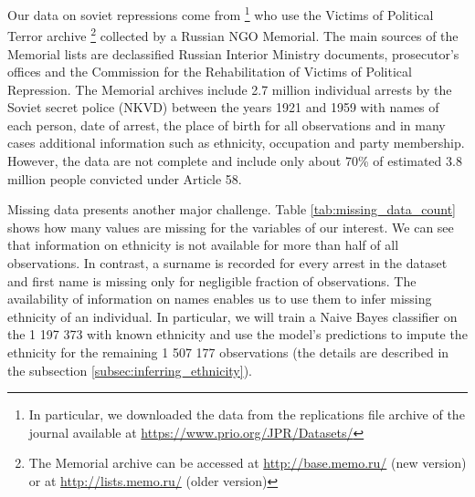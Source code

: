 Our data on soviet repressions come from  \citet{zhukov_stalins_2018}\footnote{In particular, we downloaded the data from the replications file archive of the journal available  at \url{https://www.prio.org/JPR/Datasets/}} who use  the Victims of Political Terror archive \footnote{The Memorial archive can be accessed at \url{http://base.memo.ru/} (new version) or at \url{http://lists.memo.ru/} (older version)} collected by a Russian NGO Memorial. The main sources of the Memorial lists are declassified Russian Interior Ministry documents, prosecutor’s offices and the Commission for the Rehabilitation of Victims of Political Repression.
 The Memorial archives include 2.7 million individual arrests by the Soviet secret police (NKVD) between  the years 1921 and 1959 with names of each person, date of arrest, the place of birth for all observations and  in many cases additional information such as ethnicity, occupation and party membership. 
 However, the data are not complete and include only about 70\% of estimated 3.8  million people convicted under Article 58.


Missing data presents another major challenge. 
 Table \ref{tab:missing_data_count} shows how many values are missing for the variables of our interest. We can see that information on ethnicity is not available for more than half of all observations. In contrast, a surname is recorded for every arrest in the dataset and first name is missing only for negligible fraction of observations. The availability of information on names enables us to use them to infer missing ethnicity of an individual. In particular, we will train a Naive Bayes classifier on the 1 197 373 with known ethnicity and use the model's predictions to impute the ethnicity for the remaining 1 507 177 observations (the details are described in the subsection \ref{subsec:inferring_ethnicity}).


